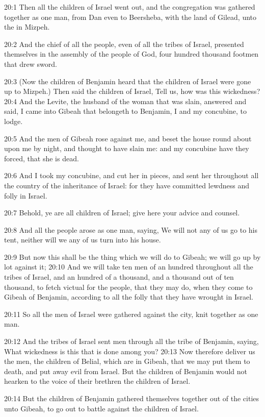 20:1 Then all the children of Israel went out, and the congregation
was gathered together as one man, from Dan even to Beersheba, with the
land of Gilead, unto the \LORD in Mizpeh.

20:2 And the chief of all the people, even of all the tribes of
Israel, presented themselves in the assembly of the people of God,
four hundred thousand footmen that drew sword.

20:3 (Now the children of Benjamin heard that the children of Israel
were gone up to Mizpeh.) Then said the children of Israel, Tell us,
how was this wickedness?  20:4 And the Levite, the husband of the
woman that was slain, answered and said, I came into Gibeah that
belongeth to Benjamin, I and my concubine, to lodge.

20:5 And the men of Gibeah rose against me, and beset the house round
about upon me by night, and thought to have slain me: and my concubine
have they forced, that she is dead.

20:6 And I took my concubine, and cut her in pieces, and sent her
throughout all the country of the inheritance of Israel: for they have
committed lewdness and folly in Israel.

20:7 Behold, ye are all children of Israel; give here your advice and
counsel.

20:8 And all the people arose as one man, saying, We will not any of
us go to his tent, neither will we any of us turn into his house.

20:9 But now this shall be the thing which we will do to Gibeah; we
will go up by lot against it; 20:10 And we will take ten men of an
hundred throughout all the tribes of Israel, and an hundred of a
thousand, and a thousand out of ten thousand, to fetch victual for the
people, that they may do, when they come to Gibeah of Benjamin,
according to all the folly that they have wrought in Israel.

20:11 So all the men of Israel were gathered against the city, knit
together as one man.

20:12 And the tribes of Israel sent men through all the tribe of
Benjamin, saying, What wickedness is this that is done among you?
20:13 Now therefore deliver us the men, the children of Belial, which
are in Gibeah, that we may put them to death, and put away evil from
Israel. But the children of Benjamin would not hearken to the voice of
their brethren the children of Israel.

20:14 But the children of Benjamin gathered themselves together out of
the cities unto Gibeah, to go out to battle against the children of
Israel.

